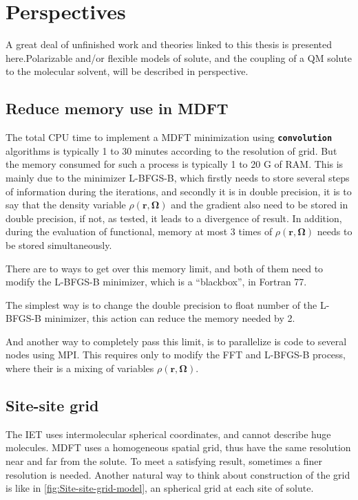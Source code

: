 
\chapter{Perspectives\label{chpt:perspectives}}

A great deal of unfinished work and theories linked to this thesis
is presented here.Polarizable and/or flexible models of solute, and
the coupling of a QM solute to the molecular solvent, will be described
in perspective.

\section{Reduce memory use in MDFT}

The total CPU time to implement a MDFT minimization using \texttt{\textbf{convolution}}
algorithms is typically 1 to 30 minutes according to the resolution
of grid. But the memory consumed for such a process is typically 1
to 20 G of RAM. This is mainly due to the minimizer L-BFGS-B, which
firstly needs to store several steps of information during the iterations,
and secondly it is in double precision, it is to say that the density
variable $\rho(\mathbf{r},\mathbf{\Omega})$ and the gradient also
need to be stored in double precision, if not, as tested, it leads
to a divergence of result. In addition, during the evaluation of functional,
memory at most 3 times of $\rho(\mathbf{r},\mathbf{\Omega})$ needs
to be stored simultaneously.

There are to ways to get over this memory limit, and both of them
need to modify the L-BFGS-B minimizer, which is a ``blackbox'',
in Fortran 77. 

The simplest way is to change the double precision to float number
of the L-BFGS-B minimizer, this action can reduce the memory needed
by 2. 

And another way to completely pass this limit, is to parallelize is
code to several nodes using MPI. This requires only to modify the
\acs{FFT} and L-BFGS-B process, where their is a mixing of variables
$\rho(\mathbf{r},\mathbf{\Omega})$.

\section{Site-site grid}

The \acs{IET} uses intermolecular spherical coordinates, and cannot
describe huge molecules. \acs{MDFT} uses a homogeneous spatial grid,
thus have the same resolution near and far from the solute. To meet
a satisfying result, sometimes a finer resolution is needed. Another
natural way to think about construction of the grid is like in \ref{fig:Site-site-grid-model},
an spherical grid at each site of solute. 

